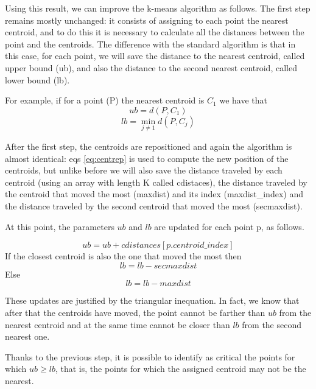 \documentclass{report}
\begin{document}
\begin{minipage}[b]{0.48\textwidth}
    Using this result, we can improve the k-means algorithm as follows.
  The first step remains mostly unchanged: it consists of assigning to each point the nearest centroid, and to do this it is necessary to calculate all the distances between the point and the centroids. The difference with the standard algorithm is that in this case, for each point, we will save the distance to the nearest centroid, called upper bound (ub), and also the distance to the second nearest centroid, called lower bound (lb).

  For example, if for a point (P) the nearest centroid is $C_1$ we have that
  \begin{equation}
      ub = d(P, C_1)
  \end{equation}
  \begin{equation}
      lb = \min\limits_{j \neq 1} d(P, C_j)
  \end{equation}

  After the first step, the centroids are repositioned and again the algorithm is almost identical: eqs \ref{eq:centrep} is used to compute the new position of the centroids, but unlike before we will also save the distance traveled by each centroid (using an array with length K called cdistaces), the distance traveled by the centroid that moved the most (maxdist) and its index (maxdist\_index) and the distance traveled by the second centroid that moved the most (secmaxdist).

  At this point, the parameters $ub$ and $lb$ are updated for each point p, as follows.

  \begin{equation}
    ub =  ub + cdistances[p.centroid\_index]
  \end{equation}
  If the closest centroid is also the one that moved the most then
  \begin{equation}
      lb = lb - secmaxdist
  \end{equation}
  Else
  \begin{equation}
      lb = lb - maxdist
  \end{equation}

  These updates are justified by the triangular inequation. In fact, we know that after that the centroids have moved, the point cannot be farther than $ub$ from the nearest centroid and at the same time cannot be closer than $lb$ from the second nearest one.

  Thanks to the previous step, it is possible to identify as critical the points for which $ub \geq lb$, that is, the points for which the assigned centroid may not be the nearest.
  

\end{minipage}
\end{document}
